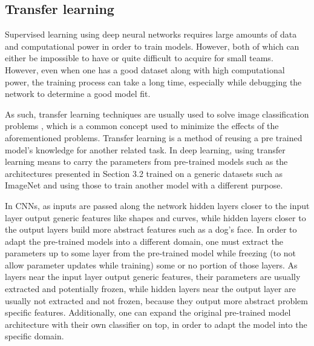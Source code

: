 \subsection{Transfer learning}
Supervised learning using deep neural networks requires large amounts of data and computational power in order to train models. However, both of which can either be impossible to have or quite difficult to acquire for small teams. However, even when one has a good dataset along with high computational power, the training process can take a long time, especially while debugging the network to determine a good model fit. \par
As such, transfer learning techniques are usually used to solve image classification problems \cite{Ly2019}, which is a common concept used to minimize the effects of the aforementioned problems. Transfer learning is a method of reusing a pre trained model's knowledge for another related task\cite{DipanjanSarkarRaghavBali2018}. In deep learning, using transfer learning means to carry the parameters from pre-trained models such as the architectures presented in Section 3.2 trained on a generic datasets such as ImageNet and using those to train another model with a different purpose.\par
In CNNs, as inputs are passed along the network hidden layers closer to the input layer output generic features like shapes and curves, while hidden layers closer to the output layers build more abstract features such as a dog's face. In order to adapt the pre-trained models into a different domain, one must extract the parameters up to some layer from the pre-trained model while freezing (to not allow parameter updates while training) some or no portion of those layers. As layers near the input layer output generic features, their parameters are usually extracted and potentially frozen, while hidden layers near the output layer are usually not extracted and not frozen, because they output more abstract problem specific features. Additionally, one can expand the original pre-trained model architecture with their own classifier on top, in order to adapt the model into the specific domain. \par 
